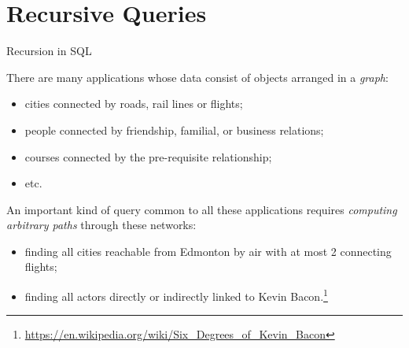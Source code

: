 \documentclass[xcolor={usenames,dvipsnames}]{beamer}
\begin{document}
%
%
%
%

%
%

\section{Recursive Queries}

\begin{frame}{Recursion in SQL}

There are many applications whose data consist of objects arranged in a \emph{graph}:
\begin{itemize}[-,noitemsep,topsep=-5pt]
\item cities connected by roads, rail lines or flights;
\item people connected by friendship, familial, or business relations;
\item courses connected by the pre-requisite relationship;
\item etc.
\end{itemize}

An important kind of query common to all these applications requires \emph{computing arbitrary paths} through these networks:
\begin{itemize}[-,noitemsep,topsep=-5pt]
\item finding all cities reachable from Edmonton by air with at most 2 connecting flights;
\item finding all actors directly or indirectly linked to Kevin Bacon.\footnote{\url{https://en.wikipedia.org/wiki/Six_Degrees_of_Kevin_Bacon}}
\end{itemize}

\end{frame}

%
%
\end{document}
